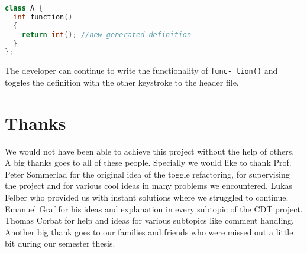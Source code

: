 \begin{lstlisting}[caption={Situation after quick implement},
label={beforeimpl}, language=C++]
class A {
  int function()
  {
    return int(); //new generated definition
  }
};
\end{lstlisting}

The developer can continue to write the functionality of \texttt{func- tion()}
and toggles the definition with the other keystroke to the header file.

\thispagestyle{empty}
\pagebreak

\chapter*{Thanks}
We would not have been able to achieve this project without the help of others.
A big thanks goes to all of these people.\newline
Specially we would like to thank Prof. Peter Sommerlad for the original idea
of the toggle refactoring, for supervising the project and for various cool
ideas in many problems we encountered. Lukas Felber who provided us with
instant solutions where we struggled to continue. Emanuel Graf for his ideas and
explanation in every subtopic of the CDT project. Thomas Corbat for help and
ideas for various subtopics like comment handling. \newline
Another big thank goes to our families and friends who were missed out a little
bit during our semester thesis.
\thispagestyle{empty}

